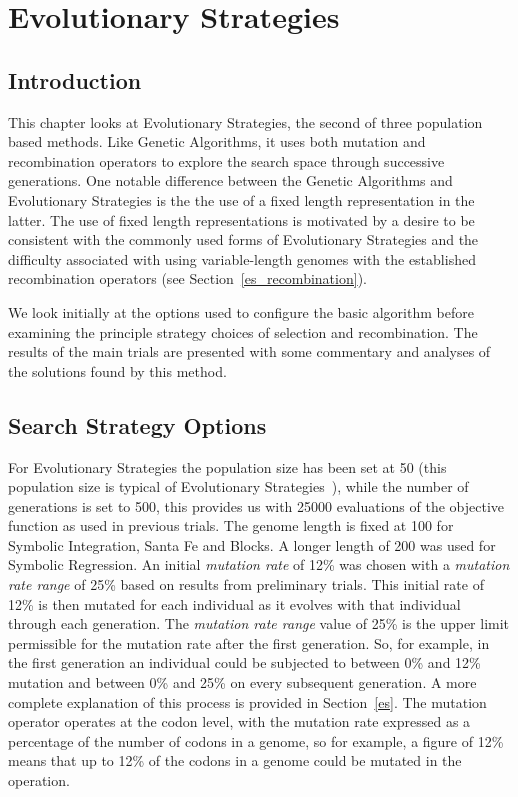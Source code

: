 \chapter{Evolutionary Strategies}
\section{Introduction}
This chapter looks at Evolutionary Strategies, the second of three population based methods. Like Genetic Algorithms, it uses both mutation and recombination operators to explore the search space through successive generations. One notable difference between the Genetic Algorithms and Evolutionary Strategies is the the use of a fixed length representation in the latter. The use of fixed length representations is motivated by a desire to be consistent with the commonly used forms of Evolutionary Strategies and the difficulty associated with using variable-length genomes with the established recombination operators (see Section~\ref{es_recombination}). 

We look initially at the options  used to configure the basic algorithm before examining the principle strategy choices of selection and recombination. The results of the main trials are presented with some commentary and analyses of the solutions found by this method.


\section{Search Strategy Options}
\label{es_options}For Evolutionary Strategies the population size has been set at 50 (this population size is typical of Evolutionary Strategies~\cite{back}), while the number of generations is set to 500, this provides us with 25000 evaluations of the objective function as used in previous trials. The genome length is fixed at 100 for Symbolic Integration, Santa Fe and Blocks. A longer length of 200 was used for Symbolic Regression.  An initial \emph{mutation rate} of 12\% was chosen with a \emph{mutation rate range} of 25\% based on results from preliminary trials. This initial rate of 12\% is then mutated for each individual as it evolves with that individual through each generation. The \emph{mutation rate range} value of 25\% is the upper limit permissible for the mutation rate after the first generation. So, for example, in the first generation an individual could be subjected to between 0\% and 12\% mutation and between 0\% and 25\% on every subsequent generation. A more complete explanation of this process is provided in Section~\ref{es}. The mutation operator operates at the codon level, with the mutation rate expressed as a percentage of the number of codons in a genome, so for example, a figure of 12\% means that up to 12\% of the codons in a genome could be mutated in the operation. 



